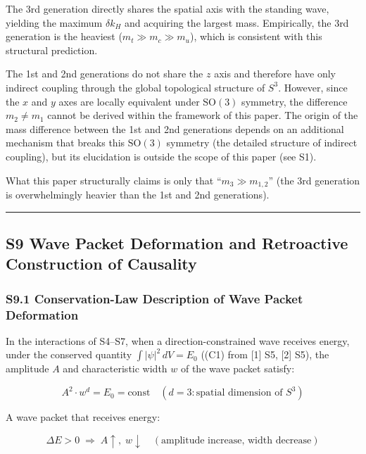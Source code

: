 \documentclass[
  a4paper,11pt]{article}
\theoremstyle{definition}
\theoremstyle{remark}
\begin{document}
The 3rd generation directly shares the spatial axis with the standing
wave, yielding the maximum \(\delta k_H\) and acquiring the largest
mass. Empirically, the 3rd generation is the heaviest
(\(m_t \gg m_c \gg m_u\)), which is consistent with this structural
prediction.

The 1st and 2nd generations do not share the \(z\) axis and therefore
have only indirect coupling through the global topological structure of
\(S^3\). However, since the \(x\) and \(y\) axes are locally equivalent
under \(\mathrm{SO}(3)\) symmetry, the difference \(m_2 \neq m_1\)
cannot be derived within the framework of this paper. The origin of the
mass difference between the 1st and 2nd generations depends on an
additional mechanism that breaks this \(\mathrm{SO}(3)\) symmetry (the
detailed structure of indirect coupling), but its elucidation is outside
the scope of this paper (see S1).

What this paper structurally claims is only that ``\(m_3 \gg m_{1,2}\)''
(the 3rd generation is overwhelmingly heavier than the 1st and 2nd
generations).

\begin{center}\rule{0.5\linewidth}{0.5pt}\end{center}

\subsection{S9 Wave Packet Deformation and Retroactive Construction of
Causality}\label{s9-wave-packet-deformation-and-retroactive-construction-of-causality}

\subsubsection{S9.1 Conservation-Law Description of Wave Packet
Deformation}\label{s9.1-conservation-law-description-of-wave-packet-deformation}

In the interactions of S4--S7, when a direction-constrained wave
receives energy, under the conserved quantity
\(\int |\psi|^2 \, dV = E_0\) ((C1) from {[}1{]} S5, {[}2{]} S5), the
amplitude \(A\) and characteristic width \(w\) of the wave packet
satisfy:

\[A^2 \cdot w^d = E_0 = \text{const} \quad (d = 3: \text{spatial dimension of } S^3)\]

A wave packet that receives energy:

\[\Delta E > 0 \;\Rightarrow\; A \uparrow,\; w \downarrow \quad (\text{amplitude increase, width decrease})\]
\end{document}
